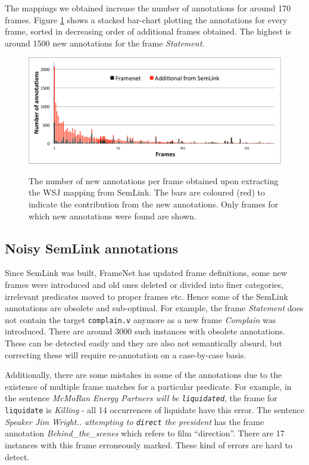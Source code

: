 \documentclass[11pt]{article}
\begin{document}
The mappings we obtained increase the number of annotations for around 170 frames. Figure \ref{fig:framesBarchart} shows a stacked bar-chart plotting the annotations for every frame, sorted in decreasing order of additional frames obtained. The highest is around 1500 new annotations for the frame \textit{Statement}.
\begin{figure}
\caption{The number of new annotations per frame obtained upon extracting the WSJ mapping from SemLink. The bars are coloured (red) to indicate the contribution from the new annotations. Only frames for which new annotations were found are shown.}
\includegraphics[scale=0.5]{framesBarchart.pdf}
\label{fig:framesBarchart}
\end{figure}

\subsection{Noisy SemLink annotations}
Since SemLink was built, FrameNet has updated frame definitions, some new frames were introduced and old ones deleted or divided into finer categories, irrelevant predicates moved to proper frames etc. Hence some of the SemLink annotations are obsolete and sub-optimal. For example, the frame \textit{Statement} does not contain the target \texttt{complain.v} anymore as a new frame \textit{Complain} was introduced. There are around 3000 such instances with obsolete annotations. These can be detected easily and they are also not semantically absurd, but correcting these will require re-annotation on a case-by-case basis.

Additionally, there are some mistakes in some of the annotations due to the existence of multiple frame matches for a particular predicate. For example, in the sentence \textit{McMoRan Energy Partners will be \texttt{liquidated}}, the frame for \texttt{liquidate} is \textit{Killing} - all 14 occurrences of liquidate have this error. The sentence \textit{Speaker Jim Wright.. attempting to \texttt{direct} the president} has the frame annotation \textit{Behind\_the\_scenes} which refers to film ``direction''. There are 17 instances with this frame erroneously marked. These kind of errors are hard to detect.
\end{document}
